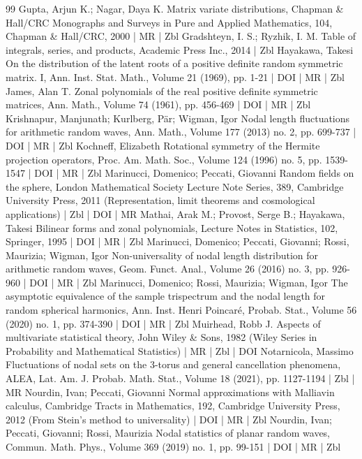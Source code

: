 \begin{thebibliography}{99}
 Gupta, Arjun K.; Nagar, Daya K. Matrix variate distributions, Chapman \& Hall/CRC Monographs and Surveys in Pure and Applied Mathematics, 104, Chapman \& Hall/CRC, 2000 | MR | Zbl
 Gradshteyn, I. S.; Ryzhik, I. M. Table of integrals, series, and products, Academic Press Inc., 2014 | Zbl
 Hayakawa, Takesi On the distribution of the latent roots of a positive definite random symmetric matrix. I, Ann. Inst. Stat. Math., Volume 21 (1969), pp. 1-21 | DOI | MR | Zbl
 James, Alan T. Zonal polynomials of the real positive definite symmetric matrices, Ann. Math., Volume 74 (1961), pp. 456-469 | DOI | MR | Zbl
 Krishnapur, Manjunath; Kurlberg, Pär; Wigman, Igor Nodal length fluctuations for arithmetic random waves, Ann. Math., Volume 177 (2013) no. 2, pp. 699-737 | DOI | MR | Zbl
 Kochneff, Elizabeth Rotational symmetry of the Hermite projection operators, Proc. Am. Math. Soc., Volume 124 (1996) no. 5, pp. 1539-1547 | DOI | MR | Zbl
 Marinucci, Domenico; Peccati, Giovanni Random fields on the sphere, London Mathematical Society Lecture Note Series, 389, Cambridge University Press, 2011 (Representation, limit theorems and cosmological applications) | Zbl | DOI | MR
 Mathai, Arak M.; Provost, Serge B.; Hayakawa, Takesi Bilinear forms and zonal polynomials, Lecture Notes in Statistics, 102, Springer, 1995 | DOI | MR | Zbl
 Marinucci, Domenico; Peccati, Giovanni; Rossi, Maurizia; Wigman, Igor Non-universality of nodal length distribution for arithmetic random waves, Geom. Funct. Anal., Volume 26 (2016) no. 3, pp. 926-960 | DOI | MR | Zbl
 Marinucci, Domenico; Rossi, Maurizia; Wigman, Igor The asymptotic equivalence of the sample trispectrum and the nodal length for random spherical harmonics, Ann. Inst. Henri Poincaré, Probab. Stat., Volume 56 (2020) no. 1, pp. 374-390 | DOI | MR | Zbl
 Muirhead, Robb J. Aspects of multivariate statistical theory, John Wiley \& Sons, 1982 (Wiley Series in Probability and Mathematical Statistics) | MR | Zbl | DOI
 Notarnicola, Massimo Fluctuations of nodal sets on the 3-torus and general cancellation phenomena, ALEA, Lat. Am. J. Probab. Math. Stat., Volume 18 (2021), pp. 1127-1194 | Zbl | MR
 Nourdin, Ivan; Peccati, Giovanni Normal approximations with Malliavin calculus, Cambridge Tracts in Mathematics, 192, Cambridge University Press, 2012 (From Stein’s method to universality) | DOI | MR | Zbl
 Nourdin, Ivan; Peccati, Giovanni; Rossi, Maurizia Nodal statistics of planar random waves, Commun. Math. Phys., Volume 369 (2019) no. 1, pp. 99-151 | DOI | MR | Zbl

\end{thebibliography}
